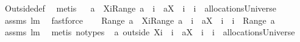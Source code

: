 \begin{isabellebody}
\ Outside{\isacharunderscore}def\ \isamarkupfalse%
\ metis\isanewline
{}\isamarkupfalse%
\ \isamarkupfalse%
\ {\isachardoublequoteopen}{\isacharparenleft}a\ {\isacharminus}\ {\isacharparenleft}{\isacharparenleft}X{\isasymunion}{\isacharbraceleft}i{\isacharbraceright}{\isacharparenright}{\isasymtimes}{\isacharparenleft}Range\ a{\isacharparenright}{\isacharparenright}{\isacharparenright}\ {\isasymunion}\ {\isacharparenleft}{\isacharbraceleft}{\isacharparenleft}i{\isacharcomma}\ {\isasymUnion}\ {\isacharparenleft}a{\isacharbackquote}{\isacharbackquote}{\isacharparenleft}X\ {\isasymunion}\ {\isacharbraceleft}i{\isacharbraceright}{\isacharparenright}{\isacharparenright}{\isacharparenright}{\isacharbraceright}\ {\isacharminus}\ {\isacharbraceleft}{\isacharparenleft}i{\isacharcomma}{\isacharbraceleft}{\isacharbraceright}{\isacharparenright}{\isacharbraceright}{\isacharparenright}\ {\isasymin}\ allocationsUniverse{\isachardoublequoteclose}\isanewline
{}\isamarkupfalse%
\ assms\ lm{}{}\ \isamarkupfalse%
\ fastforce\isanewline
{}\isamarkupfalse%
\ \isamarkupfalse%
\ {\isachardoublequoteopen}{\isasymUnion}\ {\isacharparenleft}Range\ {\isacharparenleft}{\isacharparenleft}a\ {\isacharminus}\ {\isacharparenleft}{\isacharparenleft}X{\isasymunion}{\isacharbraceleft}i{\isacharbraceright}{\isacharparenright}{\isasymtimes}{\isacharparenleft}Range\ a{\isacharparenright}{\isacharparenright}{\isacharparenright}\ {\isasymunion}\ {\isacharparenleft}{\isacharbraceleft}{\isacharparenleft}i{\isacharcomma}\ {\isasymUnion}\ {\isacharparenleft}a{\isacharbackquote}{\isacharbackquote}{\isacharparenleft}X\ {\isasymunion}\ {\isacharbraceleft}i{\isacharbraceright}{\isacharparenright}{\isacharparenright}{\isacharparenright}{\isacharbraceright}\ {\isacharminus}\ {\isacharbraceleft}{\isacharparenleft}i{\isacharcomma}{\isacharbraceleft}{\isacharbraceright}{\isacharparenright}{\isacharbraceright}{\isacharparenright}{\isacharparenright}{\isacharparenright}\ {\isacharequal}\ {\isasymUnion}{\isacharparenleft}Range\ a{\isacharparenright}{\isachardoublequoteclose}\isanewline
{}\isamarkupfalse%
\ assms\ lm{}{}\ \isamarkupfalse%
\ {\isacharparenleft}metis\ {\isacharparenleft}no{\isacharunderscore}types{\isacharparenright}{\isacharparenright}\isanewline
{}\isamarkupfalse%
\ \isamarkupfalse%
\isanewline
{\isachardoublequoteopen}{\isacharparenleft}a\ outside\ {\isacharparenleft}X{\isasymunion}{\isacharbraceleft}i{\isacharbraceright}{\isacharparenright}{\isacharparenright}\ {\isasymunion}\ {\isacharparenleft}{\isacharbraceleft}{\isacharparenleft}i{\isacharcomma}\ {\isasymUnion}\ {\isacharparenleft}a{\isacharbackquote}{\isacharbackquote}{\isacharparenleft}X\ {\isasymunion}\ {\isacharbraceleft}i{\isacharbraceright}{\isacharparenright}{\isacharparenright}{\isacharparenright}{\isacharbraceright}\ {\isacharminus}\ {\isacharbraceleft}{\isacharparenleft}i{\isacharcomma}{\isacharbraceleft}{\isacharbraceright}{\isacharparenright}{\isacharbraceright}{\isacharparenright}\ {\isasymin}\ allocationsUniverse\ {\isacharampersand}\ \isanewline

\end{isabellebody}
